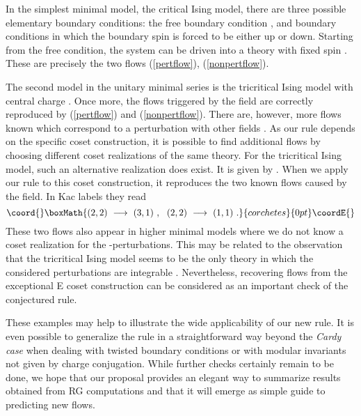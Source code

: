 \documentclass[a4paper,prd,twocolumn,nobibnotes,amssymb,preprintnumbers]{revtex4}
\begin{document}
In the simplest minimal model, the critical Ising model, there are
three possible elementary boundary conditions: the free boundary 
condition \coordHE{}, and boundary conditions \coordHE{} in 
which the boundary spin is forced to be either up or down. Starting 
from the free condition, the system can be driven into a theory with 
fixed spin \cite{Ghoshal:1994tm}. These are precisely the two flows 
(\ref{pertflow}), (\ref{nonpertflow}).

The second model in the unitary minimal series is the tricritical Ising
model with central charge \coordHE{}. Once more, the flows triggered by 
the \coordHE{} field \cite{Chim:1996kf} are correctly reproduced by 
(\ref{pertflow}) and (\ref{nonpertflow}). There are, however, more 
flows known which correspond to a perturbation with other fields 
\cite{Affleck:2000jv}. As our rule depends on the specific coset 
construction, it is possible to find additional flows by choosing  
different coset realizations of the same theory. For the tricritical 
Ising model, such an alternative realization does exist. It is 
given by \coordHE{}. 
When we apply our rule to this coset construction, it reproduces the two
known flows caused by the \coordHE{} field. In Kac labels they read 
\[\coord{}\boxMath{
(2,2)\ \longrightarrow\ (3,1)\ ,\ \ (2,2)\ \longrightarrow\ (1,1)\ .
}{corchetes}{0pt}\coordE{}\]
These two flows also appear in higher minimal models \cite{Graham:2001tg} 
where we do not know a coset realization for the
\coordHE{}-perturbations. 
This may be related to the observation that the tricritical Ising model 
seems to be the only theory in which the considered perturbations are 
integrable \cite{Graham:2001tg}. Nevertheless, recovering flows from
the exceptional E\coordHE{} coset construction can be considered as an
important check of the conjectured rule.
\medskip 

These examples may help to illustrate the wide applicability 
of our new rule. It is even possible to generalize the rule in a
straightforward way beyond the {\em Cardy case} when dealing with twisted
boundary conditions or with modular invariants not given by charge
conjugation. While further checks certainly remain to be 
done, we hope that our proposal provides an elegant way to 
summarize results obtained from RG computations and that it 
will emerge as simple guide to predicting new flows.  
\smallskip  
\end{document}

